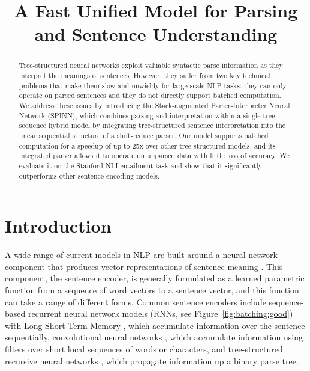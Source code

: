 \documentclass[11pt]{article}
\title{A Fast Unified Model for Parsing and Sentence Understanding}
\author{}
\date{}
\begin{document}
\maketitle
\begin{abstract}

Tree-structured neural networks exploit valuable syntactic parse information as they interpret the meanings of sentences. However, they suffer from two key technical problems that make them slow and unwieldy for large-scale NLP tasks: they can only operate on parsed sentences and they do not directly support batched computation. We address these issues by introducing the Stack-augmented Parser-Interpreter Neural Network (SPINN), which combines parsing and interpretation within a single tree-sequence hybrid model by integrating tree-structured sentence interpretation into the linear sequential structure of a shift-reduce parser. Our model supports batched computation for a speedup of up to 25x over other tree-structured models, and its integrated parser allows it to operate on unparsed data with little loss of accuracy. We evaluate it on the Stanford NLI entailment task and show that it significantly outperforms other sentence-encoding models.
\end{abstract}

\section{Introduction}




A wide range of current models in NLP are built around a neural network component that produces vector representations of sentence meaning \citep[e.g.,][]{sutskever2014sequence,tai2015improved}. This component, the sentence encoder, is generally formulated as a learned parametric function from a sequence of word vectors to a sentence vector, and this function can take a range of different forms. Common sentence encoders include sequence-based recurrent neural network models (RNNs, see Figure~\ref{fig:batching:good}) with Long Short-Term Memory \citep[LSTM,][]{hochreiter1997long}, which accumulate information over the sentence sequentially, convolutional neural networks \citep{kalchbrenner2014convolutional,DBLP:journals/corr/ZhangZL15}, which accumulate information using filters over short local sequences of words or characters, and tree-structured recursive neural networks \citep[TreeRNNs,][see Figure~\ref{fig:batching:bad}]{goller1996learning,socher2011parsing}, which propagate information up a binary parse tree.
\end{document}
